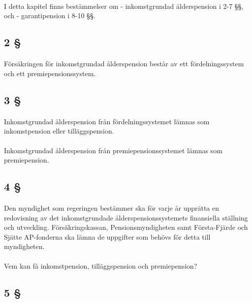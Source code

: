 \documentclass[a4paper,notitlepage,openany,10pt]{book}
\begin{document}
\paragraph*{}
I detta kapitel finns bestämmelser om
\newline - inkomstgrundad ålderspension i 2-7 §§, och
\newline - garantipension i 8-10 §§.
\subsection*{2 §}
\paragraph*{}
Försäkringen för inkomstgrundad ålderspension består av ett fördelningssystem och ett premiepensionssystem.
\subsection*{3 §}
\paragraph*{}
Inkomstgrundad ålderspension från fördelningssystemet lämnas som inkomstpension eller tilläggspension.
\paragraph*{}
Inkomstgrundad ålderspension från premiepensionssystemet lämnas som premiepension.
\subsection*{4 §}
\paragraph*{}
Den myndighet som regeringen bestämmer ska för varje år upprätta en redovisning av det inkomstgrundade ålderspensionssystemets finansiella ställning och utveckling.
Försäkringskassan, Pensionsmyndigheten samt Första-Fjärde och Sjätte AP-fonderna ska lämna de uppgifter som behövs för detta till myndigheten.
\paragraph*{}
Vem kan få inkomstpension, tilläggspension och premiepension?
\subsection*{5 §}
\end{document}
